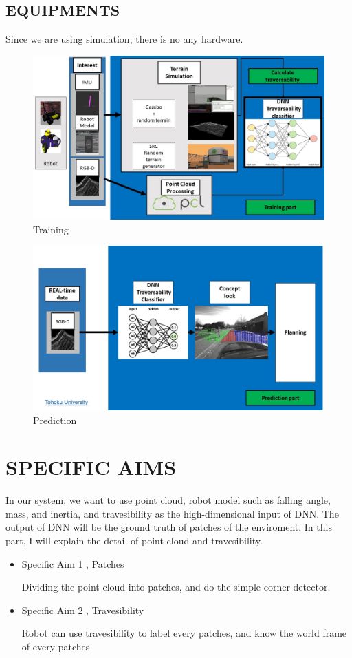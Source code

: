 \documentclass[letterpaper, 10 pt, conference]{ieeeconf}  %
\begin{document}
\subsection{EQUIPMENTS} 
Since we are using simulation, there is no any hardware.  
\begin{figure}[h] %
\includegraphics[width=0.8\columnwidth]{sys1}
\centering
\caption{Training}
 \label{figure:training}
\end{figure}

\begin{figure}[t] %
\includegraphics[width=0.8\columnwidth]{sys2}
\centering
\caption{Prediction}
 \label{figure:prediction}
\end{figure}




\section{SPECIFIC AIMS}

In our system, we want to use point cloud, robot model such as falling angle, mass, and inertia, and travesibility as the high-dimensional input of DNN. The output of DNN will be the ground truth of patches of the enviroment. In this part, I will explain the detail of point cloud and travesibility.
\begin{itemize}
\item Specific Aim 1 , Patches

Dividing the point cloud into patches, and do the simple corner detector. 
\item Specific Aim 2 , Travesibility

Robot can use travesibility to label every patches, and know the world frame of every patches
\end{itemize}
\end{document}
